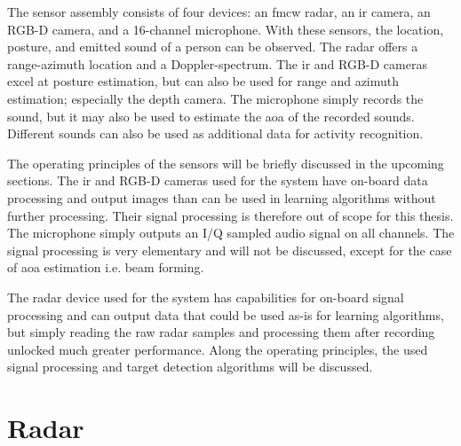 \label{annex:fmcw-radar-processing}

The sensor assembly consists of four devices:
an \gls{fmcw} radar, an \gls{ir} camera, an RGB-D camera, and a 16-channel microphone.
With these sensors, the location, posture, and emitted sound of a person can be observed.
The radar offers a range-azimuth location and a Doppler-spectrum. %
The \gls{ir} and RGB-D cameras excel at posture estimation,  %
but can also be used for range and azimuth estimation; especially the depth camera. %
The microphone simply records the sound, 
but it may also be used to estimate the \gls{aoa} of the recorded sounds. %
Different sounds can also be used as additional data for activity recognition. %

The operating principles of the sensors will be briefly discussed in the upcoming sections.
The \gls{ir} and RGB-D cameras used for the system have on-board data processing and 
output images than can be used in learning algorithms without further processing. %
Their signal processing is therefore out of scope for this thesis.
The microphone simply outputs an I/Q sampled audio signal on all channels.
The signal processing is very elementary and will not be discussed,
except for the case of \gls{aoa} estimation i.e. beam forming.

The radar device used for the system has capabilities for on-board signal processing 
and can output data that could be used as-is for learning algorithms,
but simply reading the raw radar samples
and processing them after recording unlocked much greater performance.
Along the operating principles,
the used signal processing and target detection algorithms will be discussed.

\section{Radar}


